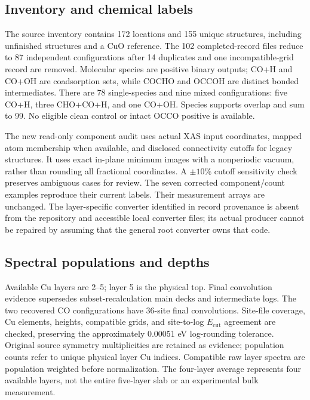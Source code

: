 \documentclass[11pt]{article}
\begin{document}
\subsection{Inventory and chemical labels}
The source inventory contains 172 locations and 155 unique structures, including unfinished structures and a CuO reference. The 102 completed-record files reduce to 87 independent configurations after 14 duplicates and one incompatible-grid record are removed. Molecular species are positive binary outputs; CO+H and CO+OH are coadsorption sets, while COCHO and OCCOH are distinct bonded intermediates. There are 78 single-species and nine mixed configurations: five CO+H, three CHO+CO+H, and one CO+OH. Species supports overlap and sum to 99. No eligible clean control or intact OCCO positive is available.

The new read-only component audit uses actual XAS input coordinates, mapped atom membership when available, and disclosed connectivity cutoffs for legacy structures. It uses exact in-plane minimum images with a nonperiodic vacuum, rather than rounding all fractional coordinates. A $\pm10\%$ cutoff sensitivity check preserves ambiguous cases for review. The seven corrected component/count examples reproduce their current labels. Their measurement arrays are unchanged. The layer-specific converter identified in record provenance is absent from the repository and accessible local converter files; its actual producer cannot be repaired by assuming that the general root converter owns that code.

\subsection{Spectral populations and depths}
Available Cu layers are 2--5; layer 5 is the physical top. Final convolution evidence supersedes subset-recalculation main decks and intermediate logs. The two recovered CO configurations have 36-site final convolutions. Site-file coverage, Cu elements, heights, compatible grids, and site-to-log $E_{\mathrm{cut}}$ agreement are checked, preserving the approximately 0.00051 eV log-rounding tolerance. Original source symmetry multiplicities are retained as evidence; population counts refer to unique physical layer Cu indices. Compatible raw layer spectra are population weighted before normalization. The four-layer average represents four available layers, not the entire five-layer slab or an experimental bulk measurement.
\end{document}
